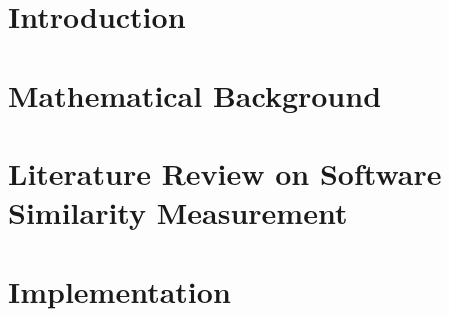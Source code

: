 \documentclass[
11pt, %
english, %
singlespacing, %
headsepline, %
]{MastersDoctoralThesis} %
\begin{document}






\mainmatter %

\pagestyle{thesis} %









	
	
	\chapter{Introduction}
	\label{sec:Introduction}
	
	\clearpage
	
	
	\chapter{Mathematical Background}
	\label{sec:MathsBackground}
	
	\clearpage
	
	
	\chapter{Literature Review on Software Similarity Measurement}	
	\label{sec:LiteratureReview}
	
	\clearpage
	\chapter{Implementation}
	\label{sec:Implementation}
	
	\clearpage
\end{document}
